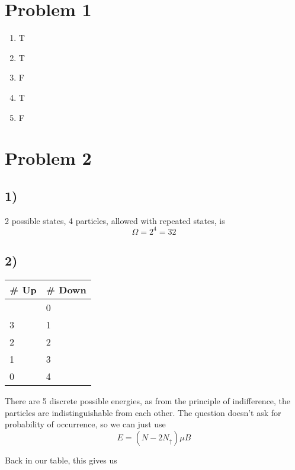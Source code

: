 \documentclass[]{article}
\providecommand{\tightlist}{%
  \setlength{\itemsep}{0pt}\setlength{\parskip}{0pt}}
\begin{document}

\hypertarget{problem-1}{%
\section{Problem 1}\label{problem-1}}

\begin{enumerate}
\def\labelenumi{\arabic{enumi}.}
\tightlist
\item
  T
\item
  T
\item
  F
\item
  T
\item
  F
\end{enumerate}

\hypertarget{problem-2}{%
\section{Problem 2}\label{problem-2}}

\hypertarget{section}{%
\subsection{1)}\label{section}}

2 possible states, 4 particles, allowed with repeated states, is \[
\Omega = 2^{4} = 32
\]

\hypertarget{section-1}{%
\subsection{2)}\label{section-1}}

\begin{longtable}[]{@{}ll@{}}
\toprule\noalign{}
\# Up & \# Down \\
\midrule\noalign{}
\endhead
\bottomrule\noalign{}
\endlastfoot
4 & 0 \\
3 & 1 \\
2 & 2 \\
1 & 3 \\
0 & 4 \\
\end{longtable}

There are 5 discrete possible energies, as from the principle of
indifference, the particles are indistinguishable from each other. The
question doesn't ask for probability of occurrence, so we can just use
\[
E = \left( N-2N_{\uparrow} \right) \mu B
\]

Back in our table, this gives us
\end{document}
